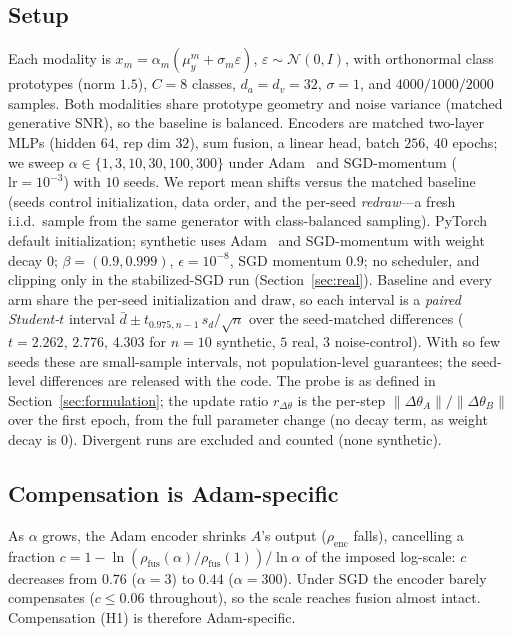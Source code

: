 \documentclass[conference]{IEEEtran}
\newcommand{\rhof}{\ensuremath{\rho_{\mathrm{fus}}}}
\newcommand{\rhoe}{\ensuremath{\rho_{\mathrm{enc}}}}
\newcommand{\updr}{\ensuremath{r_{\Delta\theta}}}
\begin{document}
\subsection{Setup}
Each modality is $x_m=\alpha_m(\mu^m_y+\sigma_m\varepsilon)$, $\varepsilon\!\sim\!\mathcal{N}(0,I)$, with orthonormal class prototypes (norm $1.5$), $C{=}8$ classes, $d_a{=}d_v{=}32$, $\sigma{=}1$, and $4000/1000/2000$ samples. Both modalities share prototype geometry and noise variance (matched generative SNR), so the baseline is balanced. Encoders are matched two-layer MLPs (hidden $64$, rep dim $32$), sum fusion, a linear head, batch $256$, $40$ epochs; we sweep $\alpha\!\in\!\{1,3,10,30,100,300\}$ under Adam~\cite{kingma2015adam} and SGD-momentum ($\mathrm{lr}=10^{-3}$) with $10$ seeds. We report mean shifts versus the matched baseline (seeds control initialization, data order, and the per-seed \emph{redraw}---a fresh i.i.d.\ sample from the same generator with class-balanced sampling). PyTorch~\cite{paszke2019pytorch} default initialization; synthetic uses Adam~\cite{kingma2015adam} and SGD-momentum with weight decay $0$; $\beta{=}(0.9,0.999)$, $\epsilon{=}10^{-8}$, SGD momentum $0.9$; no scheduler, and clipping only in the stabilized-SGD run (Section~\ref{sec:real}). Baseline and every arm share the per-seed initialization and draw, so each interval is a \emph{paired Student-$t$} interval $\bar d\pm t_{0.975,n-1}\,s_d/\sqrt n$ over the seed-matched differences ($t{=}2.262,\,2.776,\,4.303$ for $n{=}10$ synthetic, $5$ real, $3$ noise-control). With so few seeds these are small-sample intervals, not population-level guarantees; the seed-level differences are released with the code. The probe is as defined in Section~\ref{sec:formulation}; the update ratio $\updr$ is the per-step $\lVert\Delta\theta_A\rVert/\lVert\Delta\theta_B\rVert$ over the first epoch, from the full parameter change (no decay term, as weight decay is $0$). Divergent runs are excluded and counted (none synthetic).

\subsection{Compensation is Adam-specific}
As $\alpha$ grows, the Adam encoder shrinks $A$'s output ($\rhoe$ falls), cancelling a fraction $c=1-\ln(\rhof(\alpha)/\rhof(1))/\ln\alpha$ of the imposed log-scale: $c$ decreases from $0.76$ ($\alpha{=}3$) to $0.44$ ($\alpha{=}300$). Under SGD the encoder barely compensates ($c\!\le\!0.06$ throughout), so the scale reaches fusion almost intact. Compensation (H1) is therefore Adam-specific.
\end{document}
